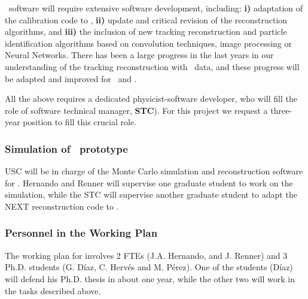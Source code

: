\Next\ software will require extensive software development, including: {\bf i)}  adaptation of the calibration code to \Next, {\bf ii)}  update and critical revision of the reconstruction algorithms, and {\bf iii)}  the inclusion of new tracking reconstruction and particle identification algorithms based on convolution techniques, image processing or Neural Networks. There has been a large progress in the last years in our understanding of the tracking reconstruction with \NEW\ data, and these progress will be adapted and improved for \NEXT\ and \NHD.

All the above requires a dedicated physicist-software developer, who will fill the role of software technical manager, {\bf STC}). For this project we request a three-year position to fill this crucial role. 

\subsubsection{Simulation of \HDEMO\ prototype}


USC will be in charge of the Monte Carlo simulation and reconstruction software for \HDEMO. Hernando and Renner will supervise one graduate student to work on the simulation, while the STC will supervise another graduate student to adapt the NEXT reconstruction code to \HDEMO. 

\subsubsection*{Personnel in the Working Plan}

The working plan for \sUSC involves 2 FTEs (J.A. Hernando, and J. Renner) and 3 Ph.D. students (G. Díaz, C. Hervés and M. Pérez). One of the students (D\'iaz) will defend his Ph.D. thesis in about one year, while the other two will work in the tasks described above. 

